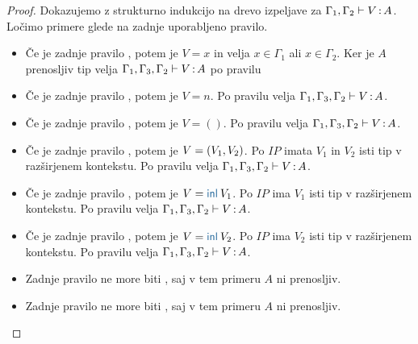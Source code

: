 \begin{proof}
	Dokazujemo z strukturno indukcijo na drevo izpeljave za $\Gamma_1, \Gamma_2 \vdash V \mathinner{:} A$.
	Ločimo primere glede na zadnje uporabljeno pravilo.
	
	\begin{itemize}
		\item Če je zadnje pravilo , potem je $V = x$ in velja $x \in \Gamma_1$ ali $x \in \Gamma_2$.
		Ker je $A$ prenosljiv tip velja $\Gamma_1, \Gamma_3, \Gamma_2 \vdash V \mathinner{:} A$ po pravilu 
		
		\item Če je zadnje pravilo , potem je $V = n$. Po pravilu  velja $\Gamma_1, \Gamma_3, \Gamma_2 \vdash V \mathinner{:} A$.
		
		\item Če je zadnje pravilo , potem je $V = ()$. Po pravilu  velja $\Gamma_1, \Gamma_3, \Gamma_2 \vdash V \mathinner{:} A$.
		
		\item Če je zadnje pravilo , potem je $V =( V_1 , V_2 )$. Po $IP$ imata $V_1$ in $V_2$ isti tip v razširjenem kontekstu.
		Po pravilu  velja $\Gamma_1, \Gamma_3, \Gamma_2 \vdash V \mathinner{:} A$.
		
		\item Če je zadnje pravilo , potem je $V = \tminl{V_1}$. Po $IP$ ima $V_1$ isti tip v razširjenem kontekstu.
		Po pravilu  velja $\Gamma_1, \Gamma_3, \Gamma_2 \vdash V \mathinner{:} A$.
		
		\item Če je zadnje pravilo , potem je $V = \tminl{V_2}$. Po $IP$ ima $V_2$ isti tip v razširjenem kontekstu.
		Po pravilu  velja $\Gamma_1, \Gamma_3, \Gamma_2 \vdash V \mathinner{:} A$.
		
		\item Zadnje pravilo ne more biti , saj v tem primeru $A$ ni prenosljiv.
		
		\item Zadnje pravilo ne more biti , saj v tem primeru $A$ ni prenosljiv.
		

\end{itemize}
\end{proof}

